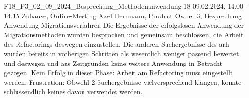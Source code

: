 \fieldnote
{F18\_P3\_02\_09\_2024\_Besprechung\_Methodenanwendung}
{18}
{09.02.2024, 14.00-14:15}
{Zuhause, Online-Meeting}
{Axel Herrmann, Product Owner}
{3, Besprechung Anwendung Migrationsverfahren}
{
  Die Ergebnisse der erfolgslosen Anwendung der Migrationsmethoden wurden besprochen und gemeinsam beschlossen, die Arbeit des Refactorings deswegen einzustellen.
  Die anderen Suchergebnisse des \gls{arh} wurden bereits in vorherigen Schritten als wesentlich weniger passend bewertet und deswegen und aus Zeitgründen keine weitere Anwendung in Betracht gezogen.
}
{
}
{
}
{
  Kein Erfolg in dieser Phase: Arbeit am Refactoring muss eingestellt werden.
}
{
  Frustration: Obwohl 2 Suchergebnisse vielversprechend klangen, konnte schlussendlich keines davon verwendet werden.
}
